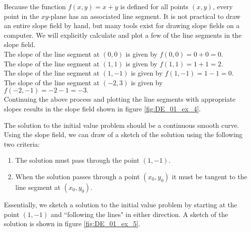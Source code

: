 {Because the function $f(x,y) = x+y$ is defined for all points $(x,y)$, every point in the $xy$-plane has an associated line segment. It is not practical to draw an entire slope field by hand, but many tools exist for drawing slope fields on a computer.  We will explicitly calculate and plot a few of the line segments in the slope field.\\

\noindent The slope of the line segment at $(0,0)$ is given by $f(0,0) = 0 + 0 = 0.$\\

\noindent The slope of the line segment at $(1,1)$ is given by $f(1,1) = 1 + 1 = 2.$\\

\noindent The slope of the line segment at $(1,-1)$ is given by $f(1,-1) = 1 - 1 = 0.$\\

\noindent The slope of the line segment at $(-2,3)$ is given by $f(-2,-1) = -2 - 1 = -3.$\\

Continuing the above process and plotting the line segments with appropriate slopes results in the slope field shown in figure \ref{fig:DE_01_ex_4}.
}\\


{The solution to the initial value problem should be a continuous smooth curve.  Using the slope field, we can draw of a sketch of the solution using the following two criteria:

\begin{enumerate}
\item The solution must pass through the point $(1,-1)$.
\item When the solution passes through a point $(x_0,y_0)$ it must be tangent to the line segment at $(x_0,y_0)$.
\end{enumerate}
Essentially, we sketch a solution to the initial value problem by starting at the point $(1,-1)$ and ``following the lines" in either direction.  A sketch of the solution is shown in figure \ref{fig:DE_01_ex_5}.
}\\

